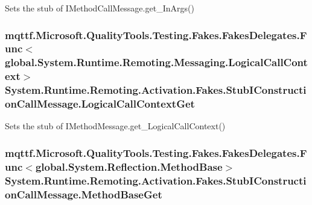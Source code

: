 Sets the stub of I\-Method\-Call\-Message.\-get\-\_\-\-In\-Args()

\hypertarget{class_system_1_1_runtime_1_1_remoting_1_1_activation_1_1_fakes_1_1_stub_i_construction_call_message_a3a6420f4036a535ec50e7dab6e0e604a}{
\subsubsection[{Logical\-Call\-Context\-Get}]{\setlength{\rightskip}{0pt plus 5cm}mqttf.\-Microsoft.\-Quality\-Tools.\-Testing.\-Fakes.\-Fakes\-Delegates.\-Func$<$global.\-System.\-Runtime.\-Remoting.\-Messaging.\-Logical\-Call\-Context$>$ System.\-Runtime.\-Remoting.\-Activation.\-Fakes.\-Stub\-I\-Construction\-Call\-Message.\-Logical\-Call\-Context\-Get}}\label{class_system_1_1_runtime_1_1_remoting_1_1_activation_1_1_fakes_1_1_stub_i_construction_call_message_a3a6420f4036a535ec50e7dab6e0e604a}


Sets the stub of I\-Method\-Message.\-get\-\_\-\-Logical\-Call\-Context()

\hypertarget{class_system_1_1_runtime_1_1_remoting_1_1_activation_1_1_fakes_1_1_stub_i_construction_call_message_ad25eb9a63408edb2f177accd542291db}{
\subsubsection[{Method\-Base\-Get}]{\setlength{\rightskip}{0pt plus 5cm}mqttf.\-Microsoft.\-Quality\-Tools.\-Testing.\-Fakes.\-Fakes\-Delegates.\-Func$<$global.\-System.\-Reflection.\-Method\-Base$>$ System.\-Runtime.\-Remoting.\-Activation.\-Fakes.\-Stub\-I\-Construction\-Call\-Message.\-Method\-Base\-Get}}\label{class_system_1_1_runtime_1_1_remoting_1_1_activation_1_1_fakes_1_1_stub_i_construction_call_message_ad25eb9a63408edb2f177accd542291db}


